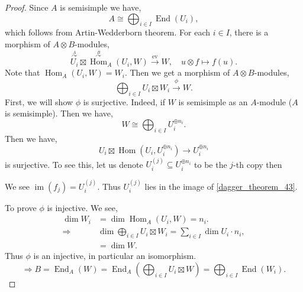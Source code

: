 \documentclass[10pt]{article}
\numberwithin{equation}{theorem}
\DeclareMathOperator{\ev}{ev}
\DeclareMathOperator{\End}{End}
\DeclareMathOperator{\Hom}{Hom}
\DeclareMathOperator{\Image}{im}
\begin{document}
\begin{proof}
  Since $A$ is semisimple we have,
  \begin{equation*}
    A \cong \bigoplus_{i\in I}\End(U_i),
  \end{equation*}
  which follows from Artin-Wedderborn theorem. For each $i\in I$, there is a morphism of $A\otimes B$-modules,
  \begin{equation*}
    \stackrel{\stackrel{A}{\curvearrowright}}{U_i}\boxtimes \stackrel{\stackrel{B}{\curvearrowright}}{\Hom}_A(U_i,W)\stackrel{\ev}{\to} W,\quad u\otimes f\mapsto f(u).
  \end{equation*}
  Note that $\Hom_A(U_i,W) = W_i$. Then we get a morphism of $A\otimes B$-modules,
  \begin{equation*}
    \bigoplus_{i\in I}U_i\boxtimes W_i\stackrel{\phi}{\to}W.
  \end{equation*}
  First, we will show $\phi$ is surjective. Indeed, if $W$ is semisimple as an $A$-module ($A$ is semisimple). Then we have,
  \begin{equation*}
    W\cong\bigoplus_{i\in I}U_i^{\oplus n_i}.
  \end{equation*}
  Then we have,
  \begin{equation}
    U_i\boxtimes\Hom(U_i,U_i^{\oplus n_i})\to U_i^{\oplus n_i}\label{dagger_theorem_43}
  \end{equation}
  is surjective. To see this, let us denote $U_i^{(j)}\subseteq U_i^{\oplus n_i}$ to be the $j$-th copy then
  \begin{center}
  \end{center}
  We see $\Image(f_j) = U_i^{(j)}$. Thus $U_i^{(j)}$ lies in the image of \eqref{dagger_theorem_43}. \\
  \par To prove $\phi$ is injective. We see,
  \begin{align*}
    \dim W_i & = \dim \Hom_A(U_i,W) = n_i.\\
    \Rightarrow & \dim\bigoplus_{i\in I}U_i\boxtimes W_i = \sum_{i\in I}\dim U_i\cdot n_i,\\
    & = \dim W.
  \end{align*}
  Thus $\phi$ is an injective, in particular an isomorphism.
  \begin{equation*}
    \Rightarrow B = \End_A(W) = \End_A\left(\bigoplus_{i\in I}U_i\boxtimes W\right) = \bigoplus_{i\in I}\End(W_i).

\end{equation*}
\end{proof}
\end{document}
